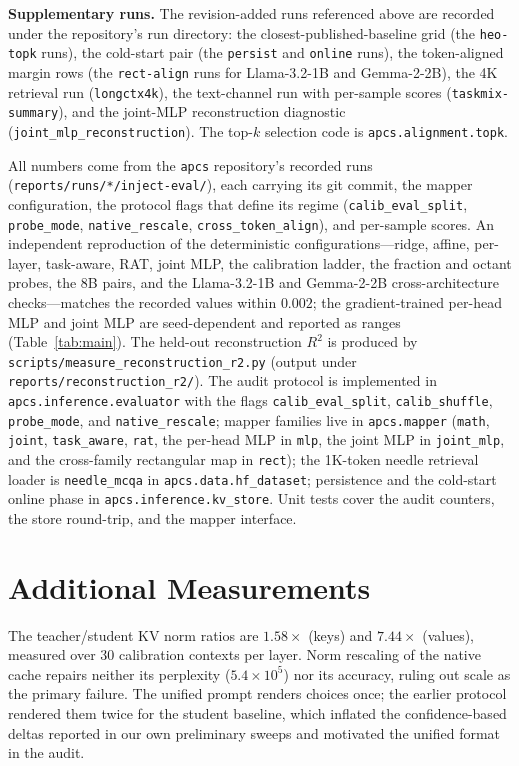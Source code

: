 \documentclass[10pt]{article}
\begin{document}
\textbf{Supplementary runs.} The revision-added runs referenced above are
recorded under the repository's run directory: the closest-published-baseline
grid (the \texttt{heo-topk} runs), the cold-start pair (the \texttt{persist} and
\texttt{online} runs), the token-aligned margin rows (the \texttt{rect-align}
runs for Llama-3.2-1B and Gemma-2-2B), the 4K retrieval run
(\texttt{longctx4k}), the text-channel run with per-sample scores
(\texttt{taskmix-summary}), and the joint-MLP reconstruction diagnostic
(\texttt{joint\_mlp\_reconstruction}). The top-$k$ selection code is
\texttt{apcs.alignment.topk}.

All numbers come from the \texttt{apcs} repository's recorded runs
(\texttt{reports/runs/*/inject-eval/}), each carrying its git commit, the
mapper configuration, the protocol flags that define its regime
(\texttt{calib\_eval\_\allowbreak split}, \texttt{probe\_mode},
\texttt{native\_\allowbreak rescale},
\texttt{cross\_\allowbreak token\_\allowbreak align}), and per-sample scores. An independent
reproduction of the deterministic configurations---ridge, affine, per-layer,
task-aware, RAT, joint MLP, the calibration ladder, the fraction and octant
probes, the 8B pairs, and the Llama-3.2-1B and Gemma-2-2B cross-architecture
checks---matches the recorded values within
$0.002$; the gradient-trained per-head MLP and joint MLP are seed-dependent and
reported as ranges (Table~\ref{tab:main}). The held-out
reconstruction $R^2$ is produced by \texttt{scripts/measure\_reconstruction\_r2.py}
(output under \texttt{reports/reconstruction\_r2/}). The audit protocol
is implemented in \texttt{apcs.\allowbreak inference.\allowbreak evaluator}
with the flags
\texttt{calib\_eval\_\allowbreak split}, \texttt{calib\_shuffle},
\texttt{probe\_mode},
and \texttt{native\_\allowbreak rescale}; mapper families live in
\texttt{apcs.\allowbreak mapper}
(\texttt{math}, \texttt{joint}, \texttt{task\_\allowbreak aware}, \texttt{rat}, the
per-head MLP in \texttt{mlp}, the joint MLP in \texttt{joint\_\allowbreak mlp}, and the
cross-family rectangular map in \texttt{rect}); the
1K-token needle retrieval loader is \texttt{needle\_\allowbreak mcqa} in
\texttt{apcs.\allowbreak data.\allowbreak hf\_\allowbreak dataset};
persistence and the cold-start online phase in
\texttt{apcs.inference.kv\_store}. Unit tests cover the audit counters, the
store round-trip, and the mapper interface.

\section{Additional Measurements}
The teacher/student KV norm ratios are $1.58\times$ (keys) and $7.44\times$
(values), measured over 30 calibration contexts per layer. Norm rescaling of
the native cache repairs neither its perplexity ($5.4\times10^{5}$) nor its
accuracy, ruling out scale as the primary failure. The unified prompt
renders choices once; the earlier protocol rendered them twice for the
student baseline, which inflated the confidence-based deltas reported in our
own preliminary sweeps and motivated the unified format in the audit.
\end{document}
